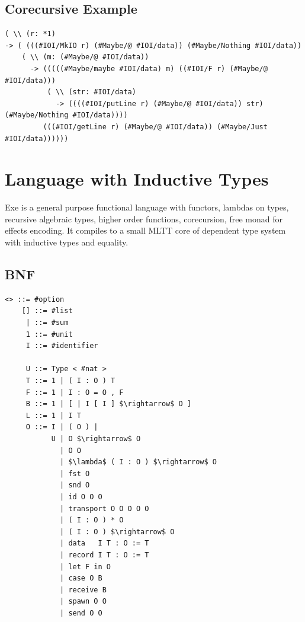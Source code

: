 \documentclass[11pt,oneside]{article}
\begin{document}
\subsection{Corecursive Example}

\begin{lstlisting}[mathescape=true]
( \\ (r: *1)
-> ( (((#IOI/MkIO r) (#Maybe/@ #IOI/data)) (#Maybe/Nothing #IOI/data))
    ( \\ (m: (#Maybe/@ #IOI/data))
      -> (((((#Maybe/maybe #IOI/data) m) ((#IOI/F r) (#Maybe/@ #IOI/data)))
          ( \\ (str: #IOI/data)
            -> ((((#IOI/putLine r) (#Maybe/@ #IOI/data)) str) (#Maybe/Nothing #IOI/data))))
         (((#IOI/getLine r) (#Maybe/@ #IOI/data)) (#Maybe/Just #IOI/data))))))
\end{lstlisting}


\newpage
\section{Language with Inductive Types}

Exe is a general purpose functional language with functors,
lambdas on types, recursive algebraic types, higher order functions,
corecursion, free monad for effects encoding. It compiles
to a small MLTT core of dependent type system with inductive types and equality.

\subsection{BNF}

\begin{lstlisting}[mathescape=true]
    <> ::= #option
    [] ::= #list
     | ::= #sum
     1 ::= #unit
     I ::= #identifier

     U ::= Type < #nat >
     T ::= 1 | ( I : O ) T
     F ::= 1 | I : O = O , F
     B ::= 1 | [ | I [ I ] $\rightarrow$ O ]
     L ::= 1 | I T
     O ::= I | ( O ) |
           U | O $\rightarrow$ O
             | O O
             | $\lambda$ ( I : O ) $\rightarrow$ O
             | fst O
             | snd O
             | id O O O
             | transport O O O O O
             | ( I : O ) * O
             | ( I : O ) $\rightarrow$ O
             | data   I T : O := T
             | record I T : O := T
             | let F in O
             | case O B
             | receive B
             | spawn O O
             | send O O
\end{lstlisting}
\vspace{2cm}
\end{document}
